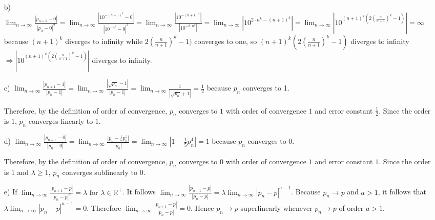 \documentclass[12pt]{article}
\begin{document}
\begin{enumerate}[label=\bfseries Problem \arabic*:]
\begin{itemize}
  \item[b)] $\displaystyle{\lim_{n\rightarrow\infty}}\frac{|p_{n+1}-0|}{|p_n-0|^2}
  =\displaystyle{\lim_{n\rightarrow\infty}}\frac{|10^{-(n+1)^k}-0|}{|10^{-n^k}-0|^2}
  =\displaystyle{\lim_{n\rightarrow\infty}}\frac{|10^{-(n+1)^k}|}{|10^{-2\cdot n^k}|}
  =\displaystyle{\lim_{n\rightarrow\infty}}|10^{2\cdot n^k-(n+1)^k}|
  =\displaystyle{\lim_{n\rightarrow\infty}}|10^{(n+1)^k(2(\frac{n}{n+1})^k-1)}|
  =\infty$ because $(n+1)^k$ diverges to infinity while $2(\frac{n}{n+1})^k-1)$ converges to one, so $(n+1)^k(2(\frac{n}{n+1})^k-1)$ diverges to infinity$\Rightarrow |10^{(n+1)^k(2(\frac{n}{n+1})^k-1)}|$ diverges to infinity.
    
  \item[c)] $\displaystyle{\lim_{n\rightarrow\infty}}\frac{|p_{n+1}-1|}{|p_n-1|}
  =\displaystyle{\lim_{n\rightarrow\infty}}\frac{|\sqrt{p_n}-1|}{|p_n-1|}
  =\displaystyle{\lim_{n\rightarrow\infty}}\frac{1}{|\sqrt{p_n}+1|}=\frac{1}{2}$ because $p_n$ converges to 1.\par 
  Therefore, by the definition of order of convergence, $p_n$ converges to $1$ with order of convergence $1$ and error constant $\frac{1}{2}$. Since the order is $1$, $p_n$ converges linearly to $1$.
  
  \item[d)] $\displaystyle{\lim_{n\rightarrow\infty}}\frac{|p_{n+1}-0|}{|p_n-0|}
  =\displaystyle{\lim_{n\rightarrow\infty}}\frac{|p_n-\frac{1}{5}p_{n}^{5}|}{|p_n|}
  =\displaystyle{\lim_{n\rightarrow\infty}}|1-\frac{1}{5}p_{n}^{4}|=1$ because $p_n$ converges to 0.\par 
  Therefore, by the definition of order of convergence, $p_n$ converges to $0$ with order of convergence $1$ and error constant $1$. Since the order is $1$ and $\lambda\ge1$, $p_n$ converges sublinearly to $0$.
  
  \item[e)] If $\displaystyle{\lim_{n\rightarrow\infty}}\frac{|p_{n+1}-p|}{|p_n-p|^a}=\lambda\text{ for }\lambda\in\mathbb{R}^+$. 
  It follows $\displaystyle{\lim_{n\rightarrow\infty}}\frac{|p_{n+1}-p|}{|p_n-p|}=\lambda\displaystyle{\lim_{n\rightarrow\infty}}|p_n-p|^{a-1}$. 
  Because $p_n\rightarrow p$ and $a>1$, it follows that $\lambda\displaystyle{\lim_{n\rightarrow\infty}}|p_n-p|^{a-1}=0$.
  Therefore $\displaystyle{\lim_{n\rightarrow\infty}}\frac{|p_{n+1}-p|}{|p_n-p|}=0$. Hence $p_n\rightarrow p$ superlinearly whenever $p_n\rightarrow p$ of order $a>1$.
  
  \end{itemize}
\newpage


\end{enumerate}
\end{document}
